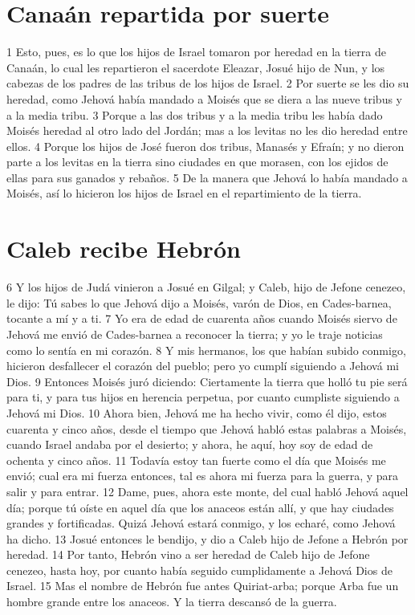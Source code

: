 \section*{Canaán repartida por suerte}

1 Esto, pues, es lo que los hijos de Israel tomaron por heredad en la tierra de Canaán, lo cual les repartieron el sacerdote Eleazar, Josué hijo de Nun, y los cabezas de los padres de las tribus de los hijos de Israel.
2 Por suerte se les dio su heredad, como Jehová había mandado a Moisés que se diera a las nueve tribus y a la media tribu. 
3 Porque a las dos tribus y a la media tribu les había dado Moisés heredad al otro lado del Jordán; mas a los levitas no les dio heredad entre ellos.
4 Porque los hijos de José fueron dos tribus, Manasés y Efraín; y no dieron parte a los levitas en la tierra sino ciudades en que morasen, con los ejidos de ellas para sus ganados y rebaños.
5 De la manera que Jehová lo había mandado a Moisés, así lo hicieron los hijos de Israel en el repartimiento de la tierra.
\section*{Caleb recibe Hebrón}

6 Y los hijos de Judá vinieron a Josué en Gilgal; y Caleb, hijo de Jefone cenezeo, le dijo: Tú sabes lo que Jehová dijo a Moisés, varón de Dios, en Cades-barnea, tocante a mí y a ti. 
7 Yo era de edad de cuarenta años cuando Moisés siervo de Jehová me envió de Cades-barnea a reconocer la tierra; y yo le traje noticias como lo sentía en mi corazón. 
8 Y mis hermanos, los que habían subido conmigo, hicieron desfallecer el corazón del pueblo; pero yo cumplí siguiendo a Jehová mi Dios.
9 Entonces Moisés juró diciendo: Ciertamente la tierra que holló tu pie será para ti, y para tus hijos en herencia perpetua, por cuanto cumpliste siguiendo a Jehová mi Dios. 
10 Ahora bien, Jehová me ha hecho vivir, como él dijo, estos cuarenta y cinco años, desde el tiempo que Jehová habló estas palabras a Moisés, cuando Israel andaba por el desierto; y ahora, he aquí, hoy soy de edad de ochenta y cinco años.
11 Todavía estoy tan fuerte como el día que Moisés me envió; cual era mi fuerza entonces, tal es ahora mi fuerza para la guerra, y para salir y para entrar.
12 Dame, pues, ahora este monte, del cual habló Jehová aquel día; porque tú oíste en aquel día que los anaceos están allí, y que hay ciudades grandes y fortificadas. Quizá Jehová estará conmigo, y los echaré, como Jehová ha dicho.
13 Josué entonces le bendijo, y dio a Caleb hijo de Jefone a Hebrón por heredad.
14 Por tanto, Hebrón vino a ser heredad de Caleb hijo de Jefone cenezeo, hasta hoy, por cuanto había seguido cumplidamente a Jehová Dios de Israel.
15 Mas el nombre de Hebrón fue antes Quiriat-arba; porque Arba fue un hombre grande entre los anaceos. Y la tierra descansó de la guerra.

